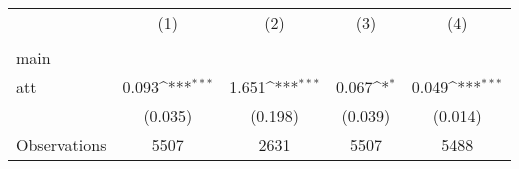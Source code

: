 {
\def\sym#1{\ifmmode^{#1}\else\(^{#1}\)\fi}
\begin{tabular}{l*{4}{c}}
\hline\hline
                    &\multicolumn{1}{c}{(1)}&\multicolumn{1}{c}{(2)}&\multicolumn{1}{c}{(3)}&\multicolumn{1}{c}{(4)}\\
                    &\multicolumn{1}{c}{} &\multicolumn{1}{c}{} &\multicolumn{1}{c}{} &\multicolumn{1}{c}{} \\
\hline
main                &                     &                     &                     &                     \\
att                 &       0.093\sym{***}&       1.651\sym{***}&       0.067\sym{*}  &       0.049\sym{***}\\
                    &     (0.035)         &     (0.198)         &     (0.039)         &     (0.014)         \\
\hline
Observations        &        5507         &        2631         &        5507         &        5488         \\
\hline\hline
\end{tabular}
}
